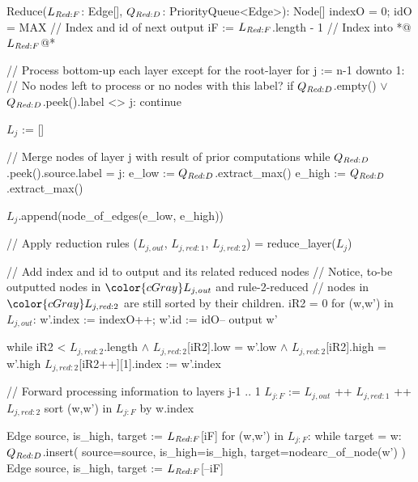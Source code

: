 \begin{blstlisting}
  Reduce($\ReduceLforward$: Edge[], $\ReduceQdep$: PriorityQueue<Edge>): Node[]
    indexO = 0; idO = MAX    // Index and id of next output
    iF := $\ReduceLforward$.length - 1         // Index into *@\color{cGray} $\ReduceLforward$@*

    // Process bottom-up each layer except for the root-layer
    for j := n-1 downto 1:
      // No nodes left to process or no nodes with this label?
      if $\ReduceQdep$.empty() $\lor$ $\ReduceQdep$.peek().label <> j:
        continue

      $L_{j}$ := []

      // Merge nodes of layer j with result of prior computations
      while $\ReduceQdep$.peek().source.label = j:
        e_low  := $\ReduceQdep$.extract_max()
        e_high := $\ReduceQdep$.extract_max()

        $L_{j}$.append(node_of_edges(e_low, e_high))

      // Apply reduction rules
      ($L_{j,\mathit{out}}$, $L_{j,\mathit{red:}1}$, $L_{j,\mathit{red:}2}$) = reduce_layer($L_{j}$)

      // Add index and id to output and its related reduced nodes
      //   Notice, to-be outputted nodes in $\color{cGray}L_{j,\mathit{out}}$ and rule-2-reduced
      //   nodes in $\color{cGray}L_{j,\mathit{red:}2}$ are still sorted by their children.
      iR2 = 0
      for (w,w') in $L_{j,\mathit{out}}$:
        w'.index := indexO++; w'.id := idO--
        output w'

        while iR2 < $L_{j,\mathit{red:}2}$.length $\land$ $L_{j,\mathit{red:}2}$[iR2].low = w'.low
                                 $\land$ $L_{j,\mathit{red:}2}$[iR2].high = w'.high
          $L_{j,\mathit{red:}2}$[iR2++][1].index := w'.index

      // Forward processing information to layers j-1 .. 1
      $L_{j:F}$ := $L_{j,\mathit{out}}$ ++ $L_{j,\mathit{red:}1}$ ++ $L_{j,\mathit{red:}2}$
      sort (w,w') in $L_{j:F}$ by w.index

      Edge{ source, is_high, target } := $\ReduceLforward$[iF]
      for (w,w') in $L_{j:F}$:
        while target = w:
          $\ReduceQdep$.insert({
            source=source,
            is_high=is_high,
            target=nodearc_of_node(w')
          })
          Edge{ source, is_high, target } := $\ReduceLforward$[--iF]
\end{blstlisting}
